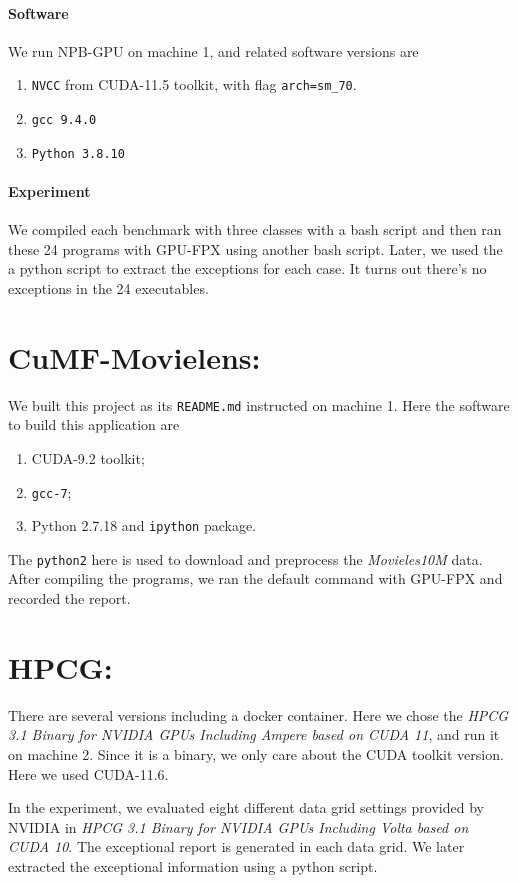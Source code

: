 \documentclass{article}
\begin{document}
	\paragraph{Software} We run NPB-GPU on machine 1, and related software versions are
	\begin{enumerate}
		\item {\tt NVCC} from CUDA-11.5 toolkit, with flag {\tt arch=sm\_70}. 
		\item {\tt gcc 9.4.0}
		\item {\tt Python 3.8.10}
	\end{enumerate}
	\paragraph{Experiment}
	We compiled each benchmark with three classes with a bash script and then ran these 24 programs with GPU-FPX using another bash script. Later, we used the a python script to extract the exceptions for each case. It turns out there's no exceptions in the 24 executables.  
	\section{CuMF-Movielens: } We built this project as its {\tt README.md} instructed on machine 1. Here the software to build this application are 
	\begin{enumerate}
		\item CUDA-9.2 toolkit;
		\item {\tt gcc-7};
		\item {Python 2.7.18} and {\tt ipython} package.
	\end{enumerate}
	The {\tt python2} here is used to download and preprocess the \textit{Movieles10M} data. After compiling the programs, we ran the default command with GPU-FPX and recorded the report.  
	\section{HPCG: } There are several versions including a docker container. Here we chose the \textit{HPCG 3.1 Binary for NVIDIA GPUs Including Ampere based on CUDA 11}, and run it on machine 2. Since it is a binary, we only care about the CUDA toolkit version. Here we used CUDA-11.6. 
	
	In the experiment, we evaluated eight different data grid settings provided by NVIDIA in \textit{HPCG 3.1 Binary for NVIDIA GPUs Including Volta based on CUDA 10}. The exceptional report is generated in each data grid. We later extracted the exceptional information using a python script. 
	
	
	
\end{document}
